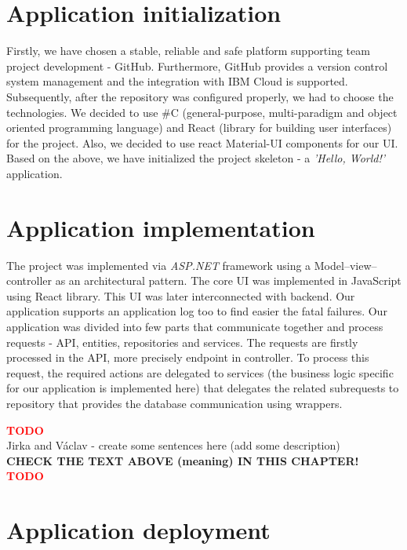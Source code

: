 \documentclass[11pt,a4paper]{article}
\newcommand{\TODO}{\textbf{\textcolor{red}{TODO}}} %
\begin{document}
\section{Application initialization}

Firstly, we have chosen a stable, reliable and safe platform supporting team project development - GitHub. Furthermore, GitHub provides a version control system management and the integration with IBM Cloud is supported. Subsequently, after the repository was configured properly, we had to choose the technologies. We decided to use \#C (general-purpose, multi-paradigm and object oriented programming language) and React (library for building user interfaces) for the project. Also, we decided to use react Material-UI components for our UI. Based on the above, we have initialized the project skeleton - a \textit{'Hello, World!'} application.

\section{Application implementation}

The project was implemented via \textit{ASP.NET} framework using a Model--view--controller as an architectural pattern. The core UI was implemented in JavaScript using React library. This UI was later interconnected with backend. Our application supports an application log too to find easier the fatal failures. Our application was divided into few parts that communicate together and process requests - API, entities, repositories and services. The requests are firstly processed in the API, more precisely endpoint in controller. To process this request, the required actions are delegated to services (the business logic specific for our application is implemented here) that delegates the related subrequests to repository that provides the database communication using wrappers.

\begin{center}
    \TODO\\
    Jirka and Václav - create some sentences here (add some description)\\
    \textbf{CHECK THE TEXT ABOVE (meaning) IN THIS CHAPTER!}\\
    \TODO
\end{center}

\section{Application deployment}
\end{document}
